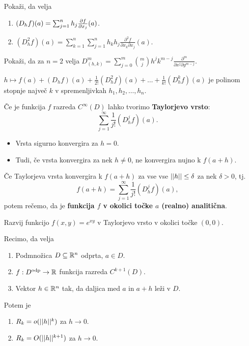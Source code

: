 \begin{opomba}
    Pokaži, da velja
    \begin{enumerate}
        \item $(D_hf)(a) = \sum_{j=1}^{n}h_j \frac{\partial f}{\partial x_j}(a)$.
        \item $(D_h^2f)(a) = \sum_{k=1}^{n} \sum_{j=1}^{n}h_kh_j \frac{\partial^2f}{\partial x_k \partial x_j}(a)$. 
    \end{enumerate}
\end{opomba}

\begin{primer}
    Pokaži, da za $n=2$ velja $D_{(h,k)}^m = \sum_{j=0}^{m} \binom{m}{j} h^j k^{m-j} \frac{\partial^m}{\partial x^j \partial y^{m-j}}$.
\end{primer}

\begin{opomba}
    $h \mapsto f(a) + (D_hf)(a) + \frac{1}{2!}(D_h^2f)(a) + \ldots + \frac{1}{k!} (D_h^kf)(a) $ je polinom stopnje največ $k$ v spremenljivkah $h_1, h_2, \ldots, h_n$.
\end{opomba}

\begin{opomba}
    Če je funkcija $f$ razreda $C^\infty(D)$ lahko tvorimo \textbf{Taylorjevo vrsto}:
    $$\sum_{j=1}^{\infty} \frac{1}{j!} (D_h^j f)(a).$$
    \begin{itemize}
        \item Vrsta sigurno konvergira za $h=0$.
        \item Tudi, če vrsta konvergira za nek $h \neq 0$, ne konvergira nujno k $f(a+h)$.
    \end{itemize}
\end{opomba}

\begin{definicija}
    Če Taylorjeva vrsta konvergira k $f(a+h)$ za vse vse $||h|| \leq \delta$ za nek $\delta > 0$, tj. 
    $$f(a+h) = \sum_{j=1}^{\infty} \frac{1}{j!} (D_h^j f)(a),$$
    potem rečemo, da je \textbf{funkcija $f$ v okolici točke $a$ (realno) analitična}.
\end{definicija}

\begin{zgled}
    Razvij funkcijo $f(x,y) = e^{xy}$ v Taylorjevo vrsto v okolici točke $(0,0)$.
\end{zgled}

\begin{posledica}
    Recimo, da velja
    \begin{enumerate}
        \item Podmnožica $D \subseteq \mathbb{R}^n$ odprta, $a \in D$.
        \item $f: D^{\text{odp}} \to \mathbb{R}$ funkcija razreda $C^{k+1}(D)$.
        \item Vektor $h \in \mathbb{R}^n$ tak, da daljica med $a$ in $a+h$ leži v $D$.
    \end{enumerate}
    Potem je 
    \begin{enumerate}
        \item $R_k = o(||h||^k)$ za $h \to 0$.
        \item $R_k = O(||h||^{k+1})$ za $h \to 0$.
    \end{enumerate}
\end{posledica}

